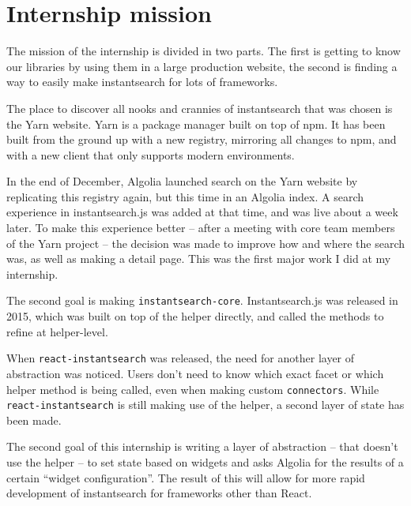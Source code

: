 
\chapter{Internship mission} %
\label{chp:mission}

The mission of the internship is divided in two parts. The first is getting to know our libraries by using them in a large production website, the second is finding a way to easily make instantsearch for lots of frameworks.

The place to discover all nooks and crannies of instantsearch that was chosen is the Yarn website\cite{yarn-site}. Yarn is a package manager built on top of npm\cite{npm-github}. It has been built from the ground up with a new registry, mirroring all changes to npm, and with a new client that only supports modern environments.

In the end of December, Algolia launched search on the Yarn website by replicating this registry again, but this time in an Algolia index. A search experience in instantsearch.js was added\cite{yarn-pr-add-algolia} at that time, and was live about a week later. To make this experience better -- after a meeting with core team members of the Yarn project -- the decision was made to improve how and where the search was, as well as making a detail page. This was the first major work I did at my internship.

The second goal is making {\tt instantsearch-core}. Instantsearch.js was released in 2015, which was built on top of the helper\cite{algolia-js-helper} directly, and called the methods to refine at helper-level.

When {\tt react-instantsearch}\cite{react-instantsearch} was released, the need for another layer of abstraction was noticed. Users don't need to know which exact facet or which helper method is being called, even when making custom {\tt connectors}\cite{react-instantsearch-connectors}. While {\tt react-instantsearch} is still making use of the helper, a second layer\cite{react-instantsearch-search-state} of state has been made.

The second goal of this internship is writing a layer of abstraction -- that doesn't use the helper -- to set state based on widgets and asks Algolia for the results of a certain ``widget configuration''. The result of this will allow for more rapid development of instantsearch for frameworks other than React.
